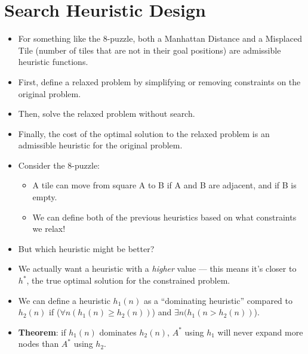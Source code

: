 \documentclass{article}
\begin{document}
\section{Search Heuristic Design}
\begin{itemize}
    \item For something like the 8-puzzle, both a Manhattan Distance and a Misplaced Tile (number of tiles that are not in their goal positions) are admissible heuristic functions.
    \item First, define a relaxed problem by simplifying or removing constraints on the original problem.
    \item Then, solve the relaxed problem without search.
    \item Finally, the cost of the optimal solution to the relaxed problem is an admissible heuristic for the original problem.
    \item Consider the 8-puzzle:
        \begin{itemize}
            \item A tile can move from square A to B if A and B are adjacent, and if B is empty.
            \item We can define both of the previous heuristics based on what constraints we relax!
        \end{itemize}
    \item But which heuristic might be better?
    \item We actually want a heuristic with a \emph{higher} value --- this means it's closer to $h^*$, the true optimal solution for the constrained problem.
    \item We can define a heuristic $h_1(n)$ as a ``dominating heuristic'' compared to $h_2(n)$ if ($\forall n (h_1(n) \geq h_2(n))$) and $\exists n (h_1(n > h_2(n))$).
    \item \textbf{Theorem}: if $h_1(n)$ dominates $h_2(n)$, $A^*$ using $h_1$ will never expand more nodes than $A^*$ using $h_2$.
\end{itemize}
\end{document}
